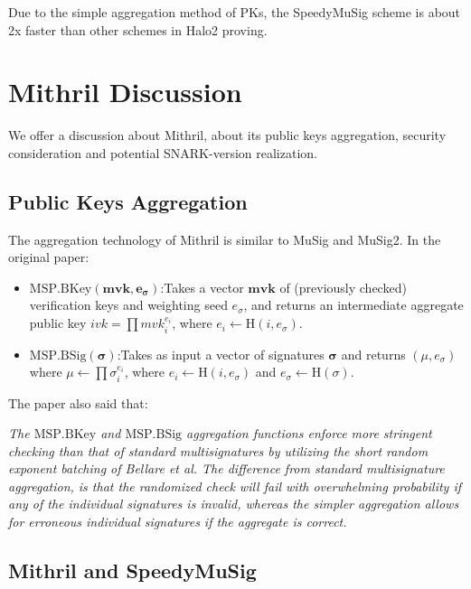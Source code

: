 \documentclass{article}
\begin{document}
Due to the simple aggregation method of PKs, the SpeedyMuSig scheme is about 2x faster than other schemes in Halo2 proving.


\section{Mithril Discussion}

We offer a discussion about Mithril, about its public keys aggregation, security consideration and potential SNARK-version realization.

\subsection{Public Keys Aggregation}

The aggregation technology of Mithril is similar to MuSig and MuSig2. In the original paper:

\begin{itemize}
    \item $\textrm{MSP.BKey}(\mathbf{mvk, e_\sigma})$:Takes a vector $\mathbf{mvk}$ of (previously checked) verification keys and weighting seed $e_\sigma$, and returns an intermediate aggregate public key $ivk=\prod mvk_i^{e_i} $, where $e_i \leftarrow \textrm{H}(i,e_\sigma)$.
    \item $\textrm{MSP.BSig}(\mathbf{\sigma})$:Takes as input a vector of signatures $\mathbf{\sigma}$ and returns $(\mu, e_\sigma)$ where $\mu \leftarrow \prod \sigma_i^{e_i}$, where $e_i \leftarrow \textrm{H}(i,e_\sigma)$ and $e_\sigma \leftarrow \textrm{H}(\sigma)$.

\end{itemize}

The paper also said that:

\textit{The $\mathrm{MSP.BKey}$ and $\mathrm{MSP.BSig}$ aggregation functions enforce more stringent checking than that of standard multisignatures by utilizing the short random exponent batching of Bellare et al. The difference from standard multisignature aggregation, is that the randomized check will fail with overwhelming probability if any of the individual signatures is invalid, whereas the simpler aggregation allows for erroneous individual signatures if the aggregate is correct.}


\subsection{Mithril and SpeedyMuSig}
\end{document}
